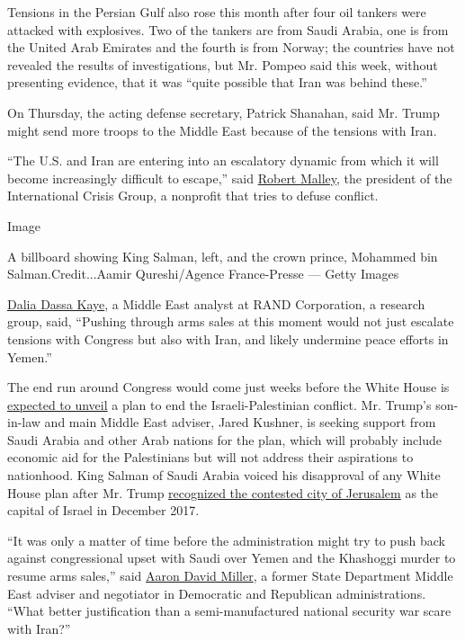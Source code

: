 Tensions in the Persian Gulf also rose this month after four oil tankers
were attacked with explosives. Two of the tankers are from Saudi Arabia,
one is from the United Arab Emirates and the fourth is from Norway; the
countries have not revealed the results of investigations, but Mr.
Pompeo said this week, without presenting evidence, that it was ``quite
possible that Iran was behind these.''

On Thursday, the acting defense secretary, Patrick Shanahan, said Mr.
Trump might send more troops to the Middle East because of the tensions
with Iran.

``The U.S. and Iran are entering into an escalatory dynamic from which
it will become increasingly difficult to escape,'' said
\href{https://www.crisisgroup.org/who-we-are/people/robert-malley-0}{Robert
Malley}, the president of the International Crisis Group, a nonprofit
that tries to defuse conflict.

Image

A billboard showing King Salman, left, and the crown prince, Mohammed
bin Salman.Credit...Aamir Qureshi/Agence France-Presse --- Getty Images

\href{https://www.rand.org/about/people/k/kaye_dalia_dassa.html}{Dalia
Dassa Kaye}, a Middle East analyst at RAND Corporation, a research
group, said, ``Pushing through arms sales at this moment would not just
escalate tensions with Congress but also with Iran, and likely undermine
peace efforts in Yemen.''

The end run around Congress would come just weeks before the White House
is
\href{https://www.nytimes.com/2019/05/19/us/politics/trump-middle-east-peace-plan.html}{expected
to unveil} a plan to end the Israeli-Palestinian conflict. Mr. Trump's
son-in-law and main Middle East adviser, Jared Kushner, is seeking
support from Saudi Arabia and other Arab nations for the plan, which
will probably include economic aid for the Palestinians but will not
address their aspirations to nationhood. King Salman of Saudi Arabia
voiced his disapproval of any White House plan after Mr. Trump
\href{https://www.nytimes.com/2017/12/06/world/middleeast/trump-jerusalem-israel-capital.html}{recognized
the contested city of Jerusalem} as the capital of Israel in December
2017.

``It was only a matter of time before the administration might try to
push back against congressional upset with Saudi over Yemen and the
Khashoggi murder to resume arms sales,'' said
\href{https://www.wilsoncenter.org/person/aaron-david-miller}{Aaron
David Miller}, a former State Department Middle East adviser and
negotiator in Democratic and Republican administrations. ``What better
justification than a semi-manufactured national security war scare with
Iran?''

